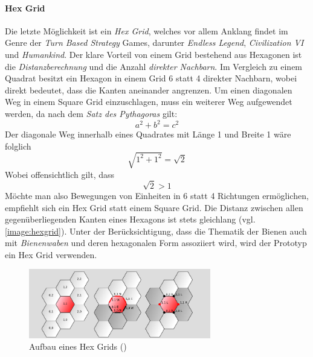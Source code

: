 \paragraph{Hex Grid}
Die letzte Möglichkeit ist ein \textit{Hex Grid}, welches vor allem Anklang findet im Genre der \textit{Turn Based Strategy} Games, darunter \textit{Endless Legend}, \textit{Civilization VI} und \textit{Humankind}. Der klare Vorteil von einem Grid bestehend aus Hexagonen ist die \textit{Distanzberechnung} und die Anzahl \textit{direkter Nachbarn}. Im Vergleich zu einem Quadrat besitzt ein Hexagon in einem Grid 6 statt 4 direkter Nachbarn, wobei direkt bedeutet, dass die Kanten aneinander angrenzen. Um einen diagonalen Weg in einem Square Grid einzuschlagen, muss ein weiterer Weg aufgewendet werden, da nach dem \textit{Satz des Pythagoras} gilt:
\begin{equation}
    a^2 + b^2 = c^2
\end{equation}
Der diagonale Weg innerhalb eines Quadrates mit Länge 1 und Breite 1 wäre folglich 
\begin{equation}
    \sqrt{1^2 + 1^2} = \sqrt{2}
\end{equation}
Wobei offensichtlich gilt, dass
\begin{equation}
    \sqrt{2} > 1
\end{equation}
Möchte man also Bewegungen von Einheiten in 6 statt 4 Richtungen ermöglichen, empfiehlt sich ein Hex Grid statt einem Square Grid. Die Distanz zwischen allen gegenüberliegenden Kanten eines Hexagons ist stets gleichlang (vgl. \autoref{image:hexgrid}). Unter der Berücksichtigung, dass die Thematik der Bienen auch mit \textit{Bienenwaben} und deren hexagonalen Form assoziiert wird, wird der Prototyp ein Hex Grid verwenden. 
\begin{figure}
    \begin{center}
        \includegraphics[width=300px]{0.bilder/hexgrid.png}
    \end{center}
    \caption{Aufbau eines Hex Grids (\cite{world:grids})} \label{image:hexgrid}
\end{figure}


